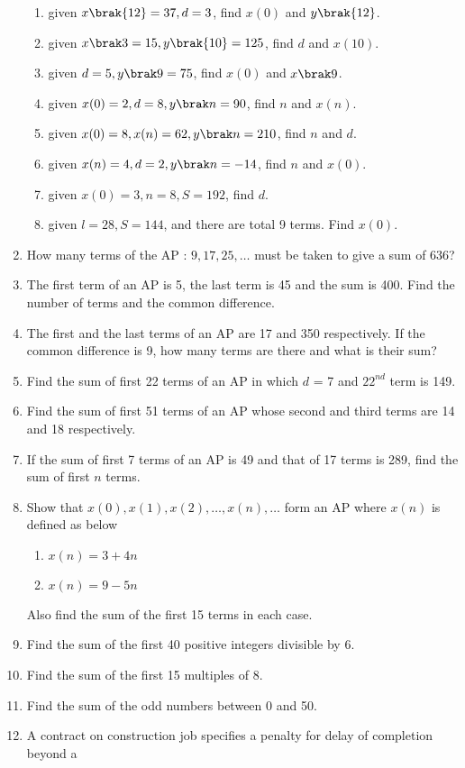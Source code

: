 \begin{enumerate}[label=\thesubsection.\arabic*, ref=\thesubsection.\theenumi]
\begin{enumerate}
\item  given $x\brak{12} = 37,  d = 3$,  find $x(0)$ and $y\brak {12}$.
\item given $x\brak3 = 15,  y\brak {10} = 125$,  find $d$ and $x(10)$.
\item given $d = 5,  y\brak 9= 75$,  find $x(0)$ and $x\brak9$.
\item given $x(0) = 2,  d = 8,  y\brak n = 90$,  find $n$ and $x(n)$.
\item  given $x(0) = 8,  x(n) = 62,  y\brak n = 210$,  find $n$ and $d$.
\item given $x(n) = 4,  d = 2,  y\brak n = -14$,  find $n$ and $x(0)$.
\item given $x(0) = 3,  n = 8,  S = 192$,  find $d$.
\item given $l = 28,  S = 144$,  and there are total 9 terms. Find $x(0)$.
\end{enumerate}
\item How many terms of the AP : $9,  17,  25,  \dots $ must be taken to give a sum of 636?
\item The first term of an AP is 5,  the last term is 45 and the sum is 400. Find the number of terms and the common difference.
\item The first and the last terms of an AP are 17 and 350 respectively. If the common difference is 9,  how many terms are there and what is their sum?
\item Find the sum of first 22 terms of an AP in which $d$ = 7 and $22^{nd}$ term is 149.
\item Find the sum of first 51 terms of an AP whose second and third terms are 14 and 18 respectively.
\item If the sum of first 7 terms of an AP is 49 and that of 17 terms is 289,  find the sum of first $n$ terms. 
\item Show that $x(0), x(1) ,  x(2) ,  \dots,  x(n),  \dots$  form an AP where $x(n)$ is defined as below 
\begin{enumerate}
	\item $x(n) = 3 + 4n$
	\item $x(n) = 9 - 5n$
\end{enumerate}
Also find the sum of the first 15 terms in each case.
\item Find the sum of the first 40 positive integers divisible by 6.
\item Find the sum of the first 15 multiples of 8.
\item Find the sum of the odd numbers between 0 and 50.
\item A contract on construction job specifies a penalty for delay of completion beyond a

\end{enumerate}
